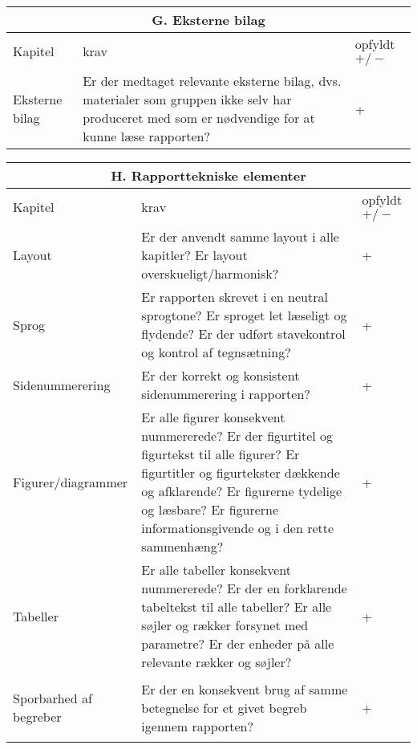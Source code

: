 \begin{center}
\begin{longtable}{|m{3.5cm}|m{10cm}|m{2.5cm}|}
\hline
\multicolumn{3}{|c|}{G. Eksterne bilag} \\ \hline
Kapitel & krav & opfyldt $+/-$ \\ \hline
Eksterne bilag & 
Er der medtaget relevante eksterne bilag, dvs. materialer som gruppen ikke selv har produceret med som er nødvendige for at kunne læse rapporten? & +\\ 
\hline
\end{longtable}
\end{center}

\begin{center}
\begin{longtable}{|m{3.5cm}|m{10cm}|m{2.5cm}|}
\hline
\multicolumn{3}{|c|}{H. Rapporttekniske elementer} \\ \hline
Kapitel & krav & opfyldt $+/-$ \\ \hline
Layout & Er der anvendt samme layout i alle kapitler? \newline
Er layout overskueligt/harmonisk? & +\\ \hline
Sprog & Er rapporten skrevet i en neutral sprogtone? \newline
Er sproget let læseligt og flydende? \newline
Er der udført stavekontrol og kontrol af tegnsætning? & +\\ \hline
Sidenummerering & Er der korrekt og konsistent sidenummerering i rapporten? & +\\ 
\hline
Figurer/diagrammer & Er alle figurer konsekvent nummererede? \newline
Er der figurtitel og figurtekst til alle figurer? \newline
Er figurtitler og figurtekster dækkende og afklarende? \newline
Er figurerne tydelige og læsbare? \newline
Er figurerne informationsgivende og i den rette sammenhæng?
& +\\ \hline
Tabeller & 
Er alle tabeller konsekvent nummererede? \newline
Er der en forklarende tabeltekst til alle tabeller? \newline
Er alle søjler og rækker forsynet med parametre? \newline
Er der enheder på alle relevante rækker og søjler? 
& +\\ \hline
\begin{flushleft} 
Sporbarhed af begreber 
\end{flushleft}
& Er der en konsekvent brug af samme betegnelse for et givet begreb igennem rapporten? & +\\ \hline
\end{longtable}
\end{center}